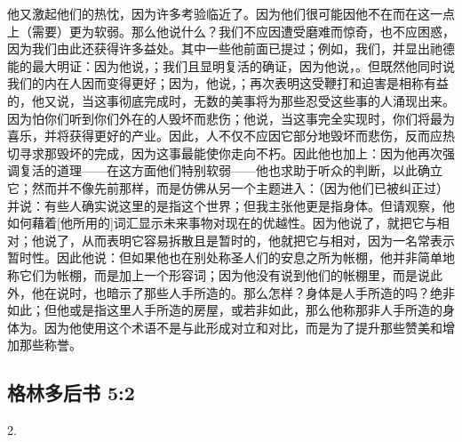 他又激起他们的热忱，因为许多考验临近了。因为他们很可能因他不在而在这一点上（需要）更为软弱。那么他说什么？我们不应因遭受磨难而惊奇，也不应困惑，因为我们由此还获得许多益处。其中一些他前面已提过；例如，我们，并显出祂德能的最大明证：因为他说，；我们且显明复活的确证，因为他说，。但既然他同时说我们的内在人因而变得更好；因为，他说，；再次表明这受鞭打和迫害是相称有益的，他又说，当这事彻底完成时，无数的美事将为那些忍受这些事的人涌现出来。因为怕你们听到你们外在的人毁坏而悲伤；他说，当这事完全实现时，你们将最为喜乐，并将获得更好的产业。因此，人不仅不应因它部分地毁坏而悲伤，反而应热切寻求那毁坏的完成，因为这事最能使你走向不朽。因此他也加上：因为他再次强调复活的道理——在这方面他们特别软弱——他也求助于听众的判断，以此确立它；然而并不像先前那样，而是仿佛从另一个主题进入：（因为他们已被纠正过）并说：有些人确实说这里的是指这个世界；但我主张他更是指身体。但请观察，他如何藉着[他所用的]词汇显示未来事物对现在的优越性。因为他说了，就把它与相对；他说了，从而表明它容易拆散且是暂时的，他就把它与相对，因为一名常表示暂时性。因此他说：但如果他也在别处称圣人们的安息之所为帐棚，他并非简单地称它们为帐棚，而是加上一个形容词；因为他没有说到他们的帐棚里，而是说此外，他在说时，也暗示了那些人手所造的。那么怎样？身体是人手所造的吗？绝非如此；但他或是指这里人手所造的房屋，或若非如此，那么他称那非人手所造的身体为。因为他使用这个术语不是与此形成对立和对比，而是为了提升那些赞美和增加那些称誉。\par


\subsection{格林多后书 5:2}

2. \par

